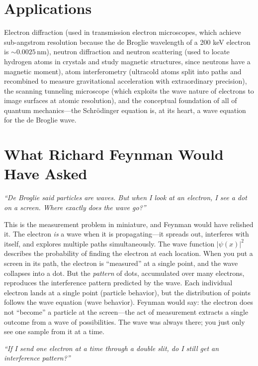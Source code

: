 \section*{Applications}

Electron diffraction (used in transmission electron microscopes, which achieve sub-angstrom resolution because the de Broglie wavelength of a 200 keV electron is $\sim 0.0025\,\text{nm}$), neutron diffraction and neutron scattering (used to locate hydrogen atoms in crystals and study magnetic structures, since neutrons have a magnetic moment), atom interferometry (ultracold atoms split into paths and recombined to measure gravitational acceleration with extraordinary precision), the scanning tunneling microscope (which exploits the wave nature of electrons to image surfaces at atomic resolution), and the conceptual foundation of all of quantum mechanics---the Schrödinger equation is, at its heart, a wave equation for the de Broglie wave.
\section*{What Richard Feynman Would Have Asked}

\textit{``De Broglie said particles are waves. But when I look at an electron, I see a dot on a screen. Where exactly does the wave go?''}

This is the measurement problem in miniature, and Feynman would have relished it. The electron \emph{is} a wave when it is propagating---it spreads out, interferes with itself, and explores multiple paths simultaneously. The wave function $|\psi(x)|^2$ describes the probability of finding the electron at each location. When you put a screen in its path, the electron is ``measured'' at a single point, and the wave collapses into a dot. But the \emph{pattern} of dots, accumulated over many electrons, reproduces the interference pattern predicted by the wave. Each individual electron lands at a single point (particle behavior), but the distribution of points follows the wave equation (wave behavior). Feynman would say: the electron does not ``become'' a particle at the screen---the act of measurement extracts a single outcome from a wave of possibilities. The wave was always there; you just only see one sample from it at a time.

\textit{``If I send one electron at a time through a double slit, do I still get an interference pattern?''}

